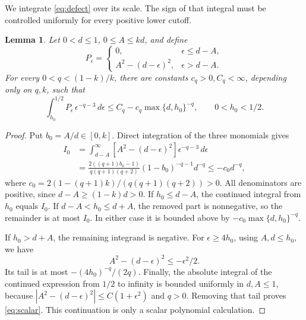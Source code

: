 \documentclass[11pt]{article}
\newtheorem{lemma}{Lemma}[section]
\theoremstyle{remark}
\numberwithin{equation}{section}
\begin{document}
We integrate \eqref{eq:defect} over its scale. The sign of that integral
must be controlled uniformly for every positive lower cutoff.

\begin{lemma}\label{lem:scalar}
Let \(0<d\le1\), \(0\le A\le kd\), and define
\[
P_\epsilon=
\begin{cases}
0,&\epsilon\le d-A,\\
A^2-(d-\epsilon)^2,&\epsilon>d-A.
\end{cases}
\]
For every \(0<q<(1-k)/k\), there are constants \(c_q>0,C_q<\infty\),
depending only on \(q,k\), such that
\begin{equation}\label{eq:scalar}
\int_{h_0}^{1/2}P_\epsilon\,\epsilon^{-q-3}\,d\epsilon
\le C_q-c_q\max\{d,h_0\}^{-q},
\qquad 0<h_0<1/2.
\end{equation}
\end{lemma}

\begin{proof}
Put \(b_0=A/d\in[0,k]\). Direct integration of the three monomials gives
\[
\begin{aligned}
I_0&=\int_{d-A}^{\infty}
[A^2-(d-\epsilon)^2]\epsilon^{-q-3}\,d\epsilon\\
&=\frac{2((q+1)b_0-1)}{q(q+1)(q+2)}
(1-b_0)^{-q-1}d^{-q}
\le-c_0d^{-q},
\end{aligned}
\]
where \(c_0=2(1-(q+1)k)/(q(q+1)(q+2))>0\).
All denominators are positive, since \(d-A\ge(1-k)d>0\).
If \(h_0\le d-A\), the continued integral from \(h_0\) equals \(I_0\).
If \(d-A<h_0\le d+A\), the removed part is nonnegative, so the remainder
is at most \(I_0\). In either case it is bounded above by
\(-c_0\max\{d,h_0\}^{-q}\).

If \(h_0>d+A\), the remaining integrand is negative.
For \(\epsilon\ge4h_0\), using \(A,d\le h_0\), we have
\[
A^2-(d-\epsilon)^2\le-\epsilon^2/2.
\]
Its tail is at most \(-(4h_0)^{-q}/(2q)\).
Finally, the absolute integral of the continued expression from \(1/2\)
to infinity is bounded uniformly in \(d,A\le1\), because
\(|A^2-(d-\epsilon)^2|\le C(1+\epsilon^2)\) and \(q>0\).
Removing that tail proves \eqref{eq:scalar}.
This continuation is only a scalar polynomial calculation.
\end{proof}
\end{document}
